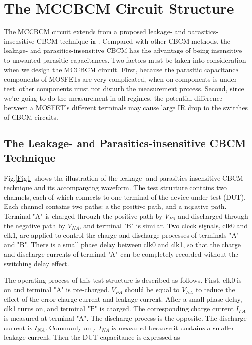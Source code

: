 \documentclass[journal]{IEEEtran}
\begin{document}

\section{The MCCBCM Circuit Structure}

The MCCBCM circuit extends from a proposed leakage- and parasitics-insensitive CBCM technique in \cite{5}. Compared with other CBCM methods, the leakage- and parasitics-insensitive CBCM has the advantage of being insensitive to unwanted parasitic capacitances. Two factors must be taken into consideration when we design the MCCBCM circuit. First, because the parasitic capacitance components of MOSFETs are very complicated, when on components is under test, other components must not disturb the measurement process. Second, since we're going to do the measurement in all regimes, the potential difference between a MOSFET's different terminals may cause large IR drop to the switches of CBCM circuits. 


\subsection{The Leakage- and Parasitics-insensitive CBCM Technique}

Fig.\ref{Fig1} shows the illustration of the leakage- and parasitics-insensitive CBCM technique and its accompanying waveform. The test structure contains two channels, each of which connects to one terminal of the device under test (DUT). Each channel contains two paths: a the positive path, and a negative path. Terminal "A" is charged through the positive path by $V_{PA}$ and discharged through the negative path by $V_{NA}$, and terminal "B" is similar. Two clock signals, clk0 and clk1, are applied to control the charge and discharge processes of terminals "A" and "B". There is a small phase delay between clk0 and clk1, so that the charge and discharge currents of terminal "A" can be completely recorded without the  switching delay effect.  


The operating process of this test structure is described as follows. First, clk0 is on and terminal "A" is pre-charged. $V_{PA}$ should be equal to $V_{NA}$ to reduce the effect of the error charge current and leakage current. After a small phase delay, clk1 turns on, and terminal "B" is charged. The corresponding charge current $I_{PA}$ is measured at terminal "A". The discharge process is the opposite. The discharge current is $I_{NA}$. Commonly only $I_{NA}$ is measured because it contains a smaller leakage current. Then the DUT capacitance is expressed as
\end{document}
